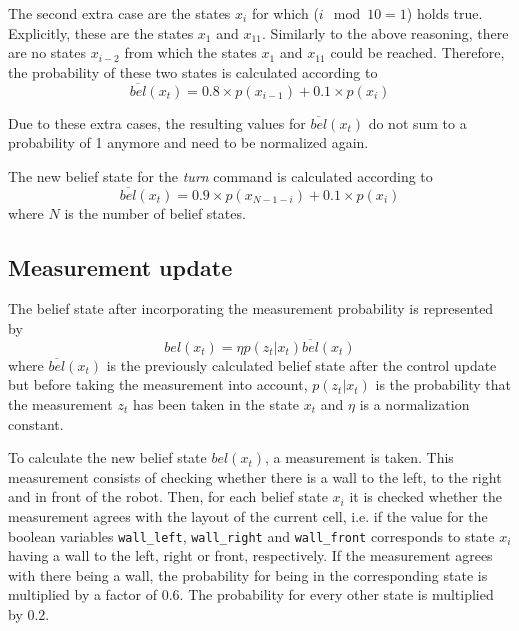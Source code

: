 \documentclass[10pt,a4paper]{article}
\begin{document}
		The second extra case are the states $x_i$ for which ($i \mod{10}=1$) holds true. Explicitly, these are the states $x_1$ and $x_{11}$. Similarly to the above reasoning, there are no states $x_{i-2}$ from which the states $x_1$ and $x_{11}$ could be reached. Therefore, the probability of these two states is calculated according to		
		\begin{displaymath}
			\overline{bel}(x_t) = 0.8\times p(x_{i-1}) + 0.1\times p(x_i)
		\end{displaymath}
		
		Due to these extra cases, the resulting values for $\overline{bel}(x_t)$ do not sum to a probability of 1 anymore and need to be normalized again.
		
		The new belief state for the \textit{turn} command is calculated according to		
		\begin{displaymath}
			\overline{bel}(x_t) = 0.9\times p(x_{N-1-i}) + 0.1\times p(x_i)
		\end{displaymath}
		where $N$ is the number of belief states.
		
		\subsection{Measurement update}
		The belief state after incorporating the measurement probability is represented by
		\begin{displaymath}
			bel(x_t)=\eta p(z_t|x_t)\overline{bel}(x_t)
		\end{displaymath}
		where $\overline{bel}(x_t)$ is the previously calculated belief state after the control update but before taking the measurement into account, $p(z_t|x_t)$ is the probability that the measurement $z_t$ has been taken in the state $x_t$ and $\eta$ is a normalization constant.
		
		To calculate the new belief state $bel(x_t)$, a measurement is taken. This measurement consists of checking whether there is a wall to the left, to the right and in front of the robot. Then, for each belief state $x_i$ it is checked whether the measurement agrees with the layout of the current cell, i.e. if the value for the boolean variables \verb|wall_left|, \verb|wall_right| and \verb|wall_front| corresponds to state $x_i$ having a wall to the left, right or front, respectively. If the measurement agrees with there being a wall, the probability for being in the corresponding state is multiplied by a factor of $0.6$. The probability for every other state is multiplied by $0.2$.
		
\end{document}
